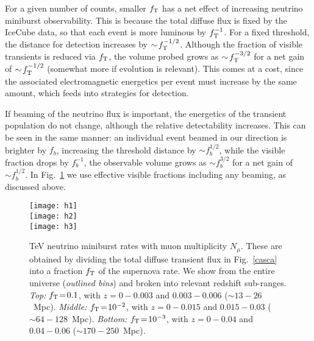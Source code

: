 \documentclass[aps,prd,nofootinbib,twocolumn,floatfix,letterpaper,superscriptaddress,showpacs]{revtex4}
\begin{document}
For a given number of counts, smaller $f_{\rm T}$ has a net effect of increasing neutrino miniburst observability.  This is because the total diffuse flux is fixed by the IceCube data, so that each event is more luminous by $f_{\rm T}^{-1}$.  For a fixed threshold, the distance for detection increases by $\sim\! f_{\rm T}^{-1/2}$.  Although the fraction of visible transients is reduced via $f_{\rm T}$, the volume probed grows as $\sim\! f_{\rm T}^{-3/2}$ for a net gain of $\sim\! f_{\rm T}^{-1/2}$ (somewhat more if evolution is relevant).
This comes at a cost, since the associated electromagnetic energetics per event must increase by the same amount, which feeds into strategies for detection.

If beaming of the neutrino flux is important, the energetics of the transient population do not change, although the relative detectability increases.  This can be seen in the same manner: an individual event beamed in our direction is brighter by $f_b$, increasing the threshold distance by $\sim\! f_b^{1/2}$, while the visible  fraction drops by $f_b^{-1}$, the observable volume grows as $\sim\! f_b^{3/2}$ for a net gain of $\sim\! f_b^{1/2}$.  In Fig.~\ref{mults} we use effective visible fractions including any beaming, as discussed above.

\begin{figure}[t!]
\texttt{[image: h1]}\\
\vspace*{-0.cm}
\texttt{[image: h2]}\\
%
\vspace*{-0.cm}
\texttt{[image: h3]}
%
\vspace*{-0.3cm}
\caption{TeV neutrino miniburst rates with muon multiplicity $N_\mu$.  These are obtained by dividing the total diffuse transient flux in Fig.~\ref{casca} into a fraction $f_{\rm T}$ of the supernova rate.  We show from the entire universe ({\it outlined bins}) and broken into relevant redshift sub-ranges.
%
{\it Top:} $f_{\rm T} \!=\! 0.1$, with $z \!=\! 0 \!-\! 0.003$ and $0.003 \!-\! 0.006$ ($\sim\! 13 \!-\! 26$~Mpc).
%
{\it Middle:}  $f_{\rm T} \!=\! 10^{-2}$, with $z \!=\! 0 \!-\! 0.015$ and $0.015 \!-\! 0.03$ ($\sim\! 64 \!-\! 128$~Mpc).
%
{\it Bottom:} $f_{\rm T} \!=\! 10^{-3}$, with $z \!=\! 0 \!-\! 0.04$ and $0.04 \!-\! 0.06$ ($\sim\! 170 \!-\! 250$~Mpc).
%
\label{mults}}
\end{figure}
\end{document}

